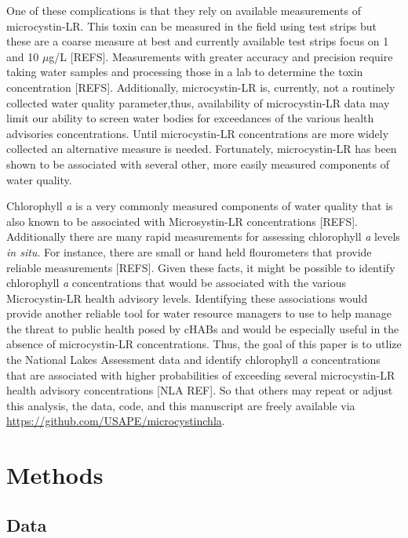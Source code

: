 \documentclass[11pt,]{article}
\begin{document}
One of these complications is that they rely on available measurements
of microcystin-LR. This toxin can be measured in the field using test
strips but these are a coarse measure at best and currently available
test strips focus on 1 and 10 \(\mu\)g/L {[}REFS{]}. Measurements with
greater accuracy and precision require taking water samples and
processing those in a lab to determine the toxin concentration
{[}REFS{]}. Additionally, microcystin-LR is, currently, not a routinely
collected water quality parameter,thus, availability of microcystin-LR
data may limit our ability to screen water bodies for exceedances of the
various health advisories concentrations. Until microcystin-LR
concentrations are more widely collected an alternative measure is
needed. Fortunately, microcystin-LR has been shown to be associated with
several other, more easily measured components of water quality.

Chlorophyll \emph{a} is a very commonly measured components of water
quality that is also known to be associated with Microsystin-LR
concentrations {[}REFS{]}. Additionally there are many rapid
measurements for assessing chlorophyll \emph{a} levels \emph{in situ}.
For instance, there are small or hand held flourometers that provide
reliable measurements {[}REFS{]}. Given these facts, it might be
possible to identify chlorophyll \emph{a} concentrations that would be
associated with the various Microcystin-LR health advisory levels.
Identifying these associations would provide another reliable tool for
water resource managers to use to help manage the threat to public
health posed by cHABs and would be especially useful in the absence of
microcystin-LR concentrations. Thus, the goal of this paper is to utlize
the National Lakes Assessment data and identify chlorophyll \emph{a}
concentrations that are associated with higher probabilities of
exceeding several microcystin-LR health advisory concentrations {[}NLA
REF{]}. So that others may repeat or adjust this analysis, the data,
code, and this manuscript are freely available via
\href{https://github.com/USAPE/microcystinchla}{\url{https://github.com/USAPE/microcystinchla}}.

\section{Methods}\label{methods}

\subsection{Data}\label{data}
\end{document}
